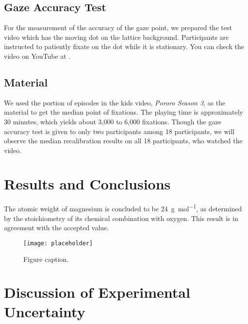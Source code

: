 \documentclass{article}
\begin{document}
\subsection{Gaze Accuracy Test}
For the measurement of the accuracy of the gaze point, we prepared the test video which has the moving dot on the lattice background. Participants are instructed to patiently fixate on the dot while it is stationary. You can check the video on YouTube at \citet{GAT}.

\subsection{Material}
We used the portion of episodes in the kids video, \textit{Pororo Season 3}, as the material to get the median point of fixations. The playing time is approximately 30 minutes, which yields about 3,000 to 6,000 fixations. Though the gaze accuracy test is given to only two participants among 18 participants, we will observe the median recalibration results on all 18 participants, who watched the video.


\section{Results and Conclusions}

The atomic weight of magnesium is concluded to be \SI{24}{\gram\per\mol}, as determined by the stoichiometry of its chemical combination with oxygen. This result is in agreement with the accepted value.

\begin{figure}[h]
\begin{center}
\texttt{[image: placeholder]} %
\caption{Figure caption.}
\end{center}
\end{figure}


\section{Discussion of Experimental Uncertainty}
\end{document}

